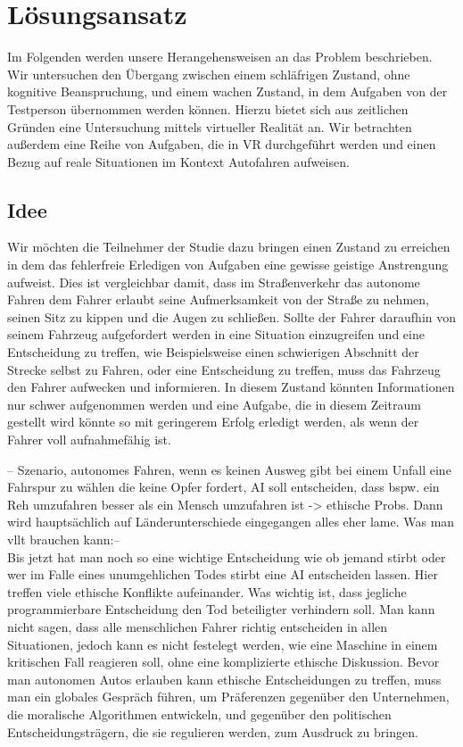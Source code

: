 \chapter{Lösungsansatz}

Im Folgenden werden unsere Herangehensweisen an das Problem beschrieben. Wir untersuchen den Übergang zwischen einem schläfrigen Zustand, ohne kognitive Beanspruchung, und einem wachen Zustand, in dem Aufgaben von der Testperson übernommen werden können. Hierzu bietet sich aus zeitlichen Gründen eine Untersuchung mittels virtueller Realität an. Wir betrachten außerdem eine Reihe von Aufgaben, die in VR durchgeführt werden und einen Bezug auf reale Situationen im Kontext Autofahren aufweisen.

\section{Idee}

Wir möchten die Teilnehmer der Studie dazu bringen einen Zustand zu erreichen in dem das fehlerfreie Erledigen von Aufgaben eine gewisse geistige Anstrengung aufweist. Dies ist vergleichbar damit, dass im Straßenverkehr das autonome Fahren dem Fahrer erlaubt seine Aufmerksamkeit von der Straße zu nehmen, seinen Sitz zu kippen und die Augen zu schließen. Sollte der Fahrer daraufhin von seinem Fahrzeug aufgefordert werden in eine Situation einzugreifen und eine Entscheidung zu treffen, wie Beispielsweise einen schwierigen Abschnitt der Strecke selbst zu Fahren, oder eine Entscheidung zu treffen, muss das Fahrzeug den Fahrer aufwecken und informieren. In diesem Zustand könnten Informationen nur schwer aufgenommen werden und eine Aufgabe, die in diesem Zeitraum gestellt wird könnte so mit geringerem Erfolg erledigt werden, als wenn der Fahrer voll aufnahmefähig ist.

-- Szenario, autonomes Fahren, wenn es keinen Ausweg gibt bei einem Unfall eine Fahrspur zu wählen die keine Opfer fordert, AI soll entscheiden, dass bspw. ein Reh umzufahren besser als ein Mensch umzufahren ist -> ethische Probs. Dann wird hauptsächlich auf Länderunterschiede eingegangen alles eher lame. Was man vllt brauchen kann:--\\
Bis jetzt hat man noch so eine wichtige Entscheidung wie ob jemand stirbt oder wer im Falle eines unumgehlichen Todes stirbt eine AI entscheiden lassen. Hier treffen viele ethische Konflikte aufeinander. Was wichtig ist, dass jegliche programmierbare Entscheidung den Tod beteiligter verhindern soll. Man kann nicht sagen, dass alle menschlichen Fahrer richtig entscheiden in allen Situationen, jedoch kann es nicht festelegt werden, wie eine Maschine in einem kritischen Fall reagieren soll, ohne eine komplizierte ethische Diskussion.
Bevor man autonomen Autos erlauben kann ethische Entscheidungen zu treffen, muss man ein globales Gespräch führen, um Präferenzen gegenüber den Unternehmen, die moralische Algorithmen entwickeln, und gegenüber den politischen Entscheidungsträgern, die sie regulieren werden, zum Ausdruck zu bringen. 


